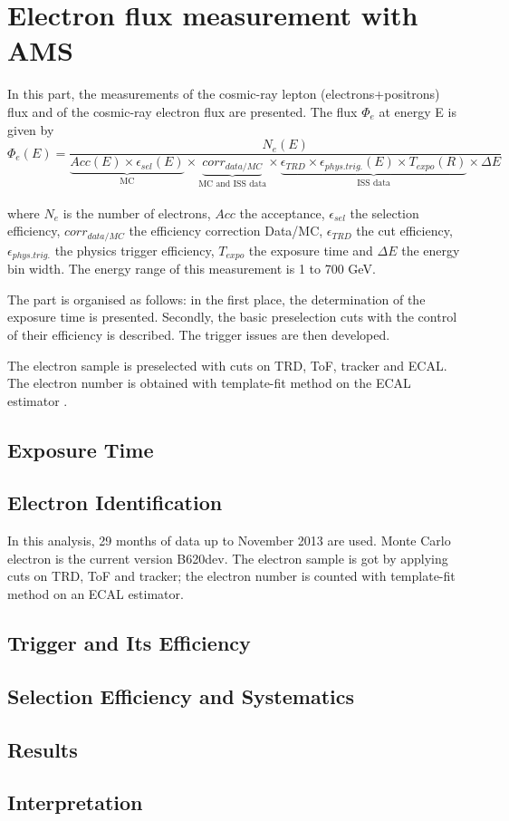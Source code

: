 \part{Electron flux measurement with AMS}
In this part, the measurements of the cosmic-ray lepton (electrons+positrons) flux and of the cosmic-ray electron flux are presented. The flux $\Phi_e$ at energy E is given by\\
\begin{equation} \label{eq:flux}
\Phi_e(E)=\frac{N_{e}(E)}{\underbrace{Acc(E)\times\epsilon_{sel}(E)}_{\text{MC}}\times\underbrace{corr_{data/MC}}_{\text{MC and ISS data}}\times\underbrace{\epsilon_{TRD}\times\epsilon_{phys.trig.}(E)\times T_{expo}(R)}_{\text{ISS data}}\times\Delta E}
\end{equation}
\\
where $N_e$ is the number of electrons, $Acc$ the acceptance, $\epsilon_{sel}$ the selection efficiency, $corr_{data/MC}$ the efficiency correction Data/MC, $\epsilon_{TRD}$ the \TRD cut efficiency, $\epsilon_{phys.trig.}$ the physics trigger efficiency, $T_{expo}$ the exposure time and $\Delta E$ the energy bin width. The energy range of this measurement is 1 to 700 GeV.  

The part is organised as follows: in the first place, the determination of the exposure time is presented. Secondly, the basic preselection cuts with the control of their efficiency is described. The trigger issues are then developed. 

The electron sample is preselected with cuts on TRD, ToF, tracker and ECAL. The electron number is obtained with template-fit method on the ECAL estimator \ESE.
\chapter{Exposure Time}


\chapter{Electron Identification}
In this analysis, 29 months of data up to November 2013 are used. Monte Carlo electron is the current version B620dev. The electron sample is got by applying cuts on TRD, ToF and tracker; the electron number is counted with template-fit method on an ECAL estimator.


\chapter{Trigger and Its Efficiency}


\chapter{Selection Efficiency and Systematics}




\chapter{Results}




\chapter{Interpretation}